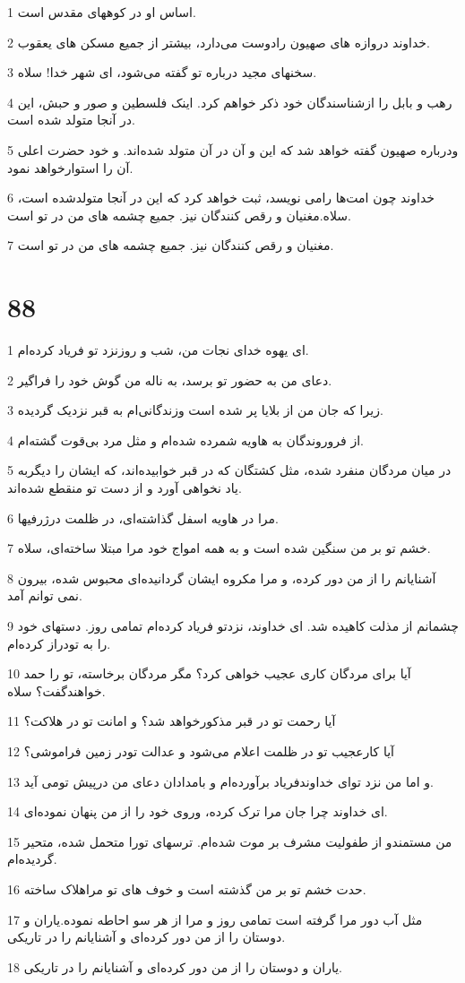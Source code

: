 \par 1 اساس او در کوههای مقدس است.
\par 2 خداوند دروازه های صهیون رادوست می‌دارد، بیشتر از جمیع مسکن های یعقوب.
\par 3 سخنهای مجید درباره تو گفته می‌شود، ای شهر خدا! سلاه.
\par 4 رهب و بابل را ازشناسندگان خود ذکر خواهم کرد. اینک فلسطین و صور و حبش، این در آنجا متولد شده است.
\par 5 ودرباره صهیون گفته خواهد شد که این و آن در آن متولد شده‌اند. و خود حضرت اعلی آن را استوارخواهد نمود.
\par 6 خداوند چون امت‌ها رامی نویسد، ثبت خواهد کرد که این در آنجا متولدشده است، سلاه.مغنیان و رقص کنندگان نیز. جمیع چشمه های من در تو است.
\par 7 مغنیان و رقص کنندگان نیز. جمیع چشمه های من در تو است.
 
\chapter{88}

\par 1 ای یهوه خدای نجات من، شب و روزنزد تو فریاد کرده‌ام.
\par 2 دعای من به حضور تو برسد، به ناله من گوش خود را فراگیر.
\par 3 زیرا که جان من از بلایا پر شده است وزندگانی‌ام به قبر نزدیک گردیده.
\par 4 از فروروندگان به هاویه شمرده شده‌ام و مثل مرد بی‌قوت گشته‌ام.
\par 5 در میان مردگان منفرد شده، مثل کشتگان که در قبر خوابیده‌اند، که ایشان را دیگربه یاد نخواهی آورد و از دست تو منقطع شده‌اند.
\par 6 مرا در هاویه اسفل گذاشته‌ای، در ظلمت درژرفیها.
\par 7 خشم تو بر من سنگین شده است و به همه امواج خود مرا مبتلا ساخته‌ای، سلاه.
\par 8 آشنایانم را از من دور کرده، و مرا مکروه ایشان گردانیده‌ای محبوس شده، بیرون نمی توانم آمد.
\par 9 چشمانم از مذلت کاهیده شد. ای خداوند، نزدتو فریاد کرده‌ام تمامی روز. دستهای خود را به تودراز کرده‌ام.
\par 10 آیا برای مردگان کاری عجیب خواهی کرد؟ مگر مردگان برخاسته، تو را حمد خواهندگفت؟ سلاه.
\par 11 آیا رحمت تو در قبر مذکورخواهد شد؟ و امانت تو در هلاکت؟
\par 12 آیا کارعجیب تو در ظلمت اعلام می‌شود و عدالت تودر زمین فراموشی؟
\par 13 و اما من نزد تو‌ای خداوندفریاد برآورده‌ام و بامدادان دعای من در‌پیش تومی آید.
\par 14 ‌ای خداوند چرا جان مرا ترک کرده، وروی خود را از من پنهان نموده‌ای.
\par 15 من مستمندو از طفولیت مشرف بر موت شده‌ام. ترسهای تورا متحمل شده، متحیر گردیده‌ام.
\par 16 حدت خشم تو بر من گذشته است و خوف های تو مراهلاک ساخته.
\par 17 مثل آب دور مرا گرفته است تمامی روز و مرا از هر سو احاطه نموده.یاران و دوستان را از من دور کرده‌ای و آشنایانم را در تاریکی.
\par 18 یاران و دوستان را از من دور کرده‌ای و آشنایانم را در تاریکی.
 
